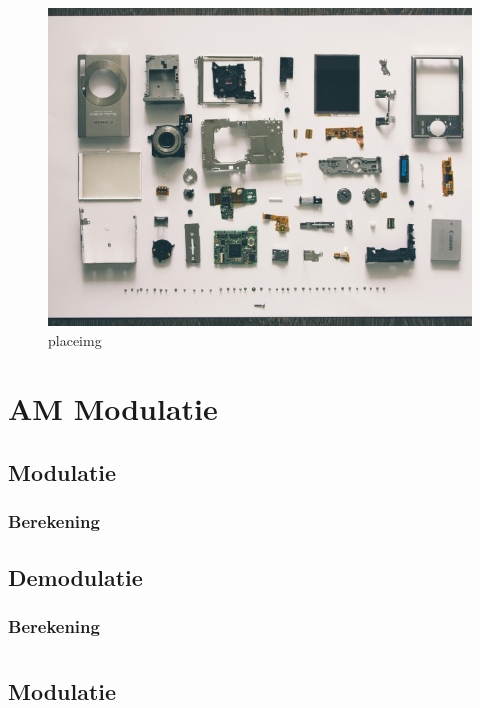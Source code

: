 \documentclass[11pt,a4paper]{article}
\begin{document}
	\begin{figure}[H]
		\includegraphics[width=1.0\textwidth]{placeimg}\par\vspace{1cm}
		\caption{placeimg}
		\label{fig:length_eight_mouse}
	\end{figure}
	
	\clearpage
	
	\section{AM Modulatie}
		
		\subsection{Modulatie}
			\subsubsection{Berekening}
			
		\subsection{Demodulatie}
			\subsubsection{Berekening}
	
	\section{}
		\subsection{Modulatie}
\end{document}
